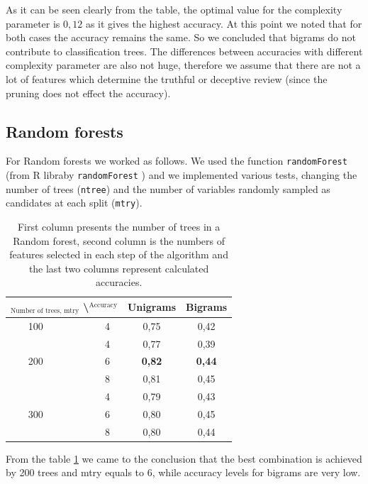 \documentclass[a4paper,11pt]{article}
\begin{document}
As it can be seen clearly from the table, the optimal value for the complexity parameter is $0{,}12$ as it gives the highest accuracy. At this point we noted that for both cases the accuracy remains the same. So we concluded that bigrams do not contribute to classification trees. The differences between accuracies with different complexity parameter are also not huge, therefore we assume that there are not a lot of features which determine the truthful or deceptive review (since the pruning does not effect the accuracy). 

\subsection{Random forests}

For Random forests we worked as follows. We used the function \verb|randomForest| (from R libraby \verb|randomForest| \cite{randomForestsL}) and we implemented various tests, changing the number of trees (\verb|ntree|) and the number of variables randomly sampled as candidates at each split (\verb|mtry|). 

\begin{table}[h!]
\centering
\begin{tabular}{m{2cm} |c || c | c}
\multicolumn{2}{c||}{$_{\text{Number of trees, mtry}}$ \textbackslash $^{\text{Accuracy}}$} & Unigrams & Bigrams \\ \hline \hline
$\quad\ \ $ 100 & 4 & 0{,}75 & 0{,}42 \\ \hline
\multirow{3}{*}{$\quad\ \ $ 200} & 4 & 0{,}77 & 0{,}39 \\ \cline{2-4}
& 6 & \textbf{0{,}82} & \textbf{0{,}44} \\ \cline{2-4}
& 8 & 0{,}81 & 0{,}45 \\ \hline
\multirow{3}{*}{$\quad\ \ $ 300} & 4 & 0{,}79 & 0{,}43 \\ \cline{2-4}
& 6 & 0{,}80 & 0{,}45 \\ \cline{2-4}
& 8 & 0{,}80 & 0{,}44 \\ 
\end{tabular}
\caption{First column presents the number of trees in a Random forest, second column is the numbers of features selected in each step of the algorithm and the last two columns represent calculated accuracies.}
\label{tab: randomForests}
\end{table}

From the table \ref{tab: randomForests} we came to the conclusion that the best combination is achieved by 200 trees and mtry equals to 6, while accuracy levels for bigrams are very low.
\end{document}
